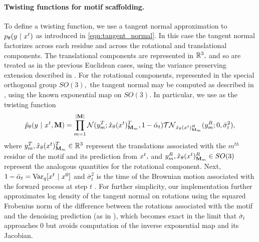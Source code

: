 \paragraph{Twisting functions for motif scaffolding.}
To define a twisting function, we use a tangent normal approximation to $p_{\theta}(y~\vert~ x^{t})$ as introduced in \cref{eqn:tangent_normal}.
In this case the tangent normal factorizes across each residue and across the rotational and translational components.
The translational components are represented in $\mathbb{R}^3,$ and so are treated as in the previous Euclidean cases, using the variance preserving extension described in .
For the rotational components, represented in the special orthogonal group $SO(3),$ the tangent normal may be computed as described in , using the known exponential map on $SO(3)$.
In particular, we use as the twisting function
\begin{align}
\tilde p_\theta (y~\vert~ x^{t}, \mathbf{M}) = \prod_{m=1}^{|\mathbf{M} |} \mathcal{N}(y^T_m; {\hat x}_\theta(x^{t})^T_{\mathbf{M}_m}, 1-\bar \alpha_t)\mathcal{TN}_{{\hat x}_\theta(x^{t})^R_{\mathbf{M}_m}}(y_m^R; 0, \bar \sigma_t^2),
\end{align}
where $y^T_m, {\hat x}_\theta(x^{t})^T_{\mathbf{M}_m} \in \mathbb{R}^3$ represent the translations associated with the $m^{th}$ residue of the motif and its prediction from $x^{t},$ and
$y^R_m, {\hat x}_\theta(x^{t})^R_{\mathbf{M}_m} \in SO(3)$ represent the analogous quantities for the rotational component.
Next, $1-\bar \alpha_t=\mathrm{Var}_q[x^{t} ~\vert~ x^{0}]$ and  $\bar \sigma_t^2$ is the time of the Brownian motion associated with the forward process at step $t$ \citep{yim2023se}.
For further simplicity, our implementation further approximates log density of the tangent normal on rotations using the squared Frobenius norm of the difference between the rotations associated with the motif and the denoising prediction (as in \citep{watson2022broadly}), which becomes exact in the limit that $\bar \sigma_t$ approaches 0 but avoids computation of the inverse exponential map and its Jacobian.









